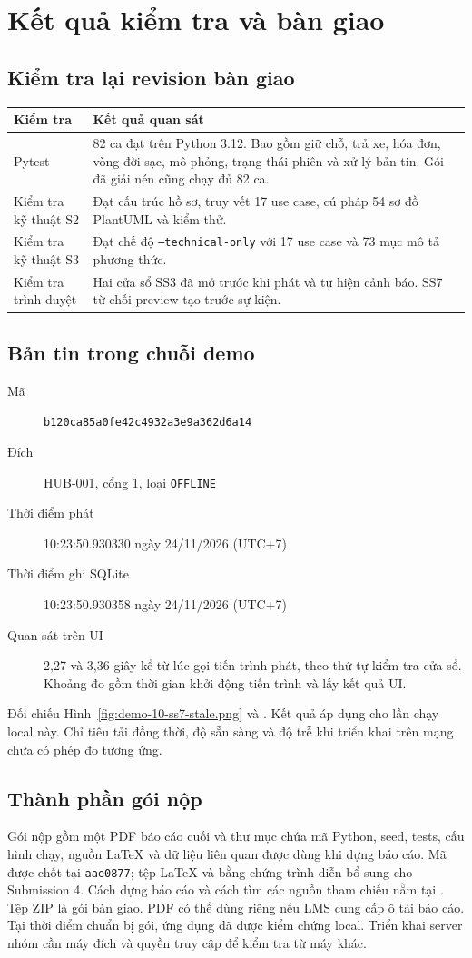 \chapter{Kết quả kiểm tra và bàn giao}
\section{Kiểm tra lại revision bàn giao}
\noindent\begin{tabularx}{\linewidth}{@{}p{.37\linewidth}X@{}}
\toprule
\textbf{Kiểm tra} & \textbf{Kết quả quan sát}\\
\midrule
Pytest & 82 ca đạt trên Python 3.12. Bao gồm giữ chỗ, trả xe, hóa đơn, vòng đời sạc,
mô phỏng, trạng thái phiên và xử lý bản tin. Gói đã giải nén cũng chạy đủ 82 ca.\\
Kiểm tra kỹ thuật S2 & Đạt cấu trúc hồ sơ, truy vết 17 use case, cú pháp 54 sơ đồ PlantUML và kiểm thử.\\
Kiểm tra kỹ thuật S3 & Đạt chế độ \texttt{--technical-only} với 17 use case và 73 mục mô tả phương thức.\\
Kiểm tra trình duyệt & Hai cửa sổ SS3 đã mở trước khi phát và tự hiện cảnh báo.
SS7 từ chối preview tạo trước sự kiện.\\
\bottomrule
\end{tabularx}

\section{Bản tin trong chuỗi demo}
\begin{description}
\item[Mã] \texttt{b120ca85a0fe42c4932a3e9a362d6a14}
\item[Đích] HUB-001, cổng 1, loại \texttt{OFFLINE}
\item[Thời điểm phát] 10:23:50.930330 ngày 24/11/2026 (UTC+7)
\item[Thời điểm ghi SQLite] 10:23:50.930358 ngày 24/11/2026 (UTC+7)
\item[Quan sát trên UI] 2,27 và 3,36 giây kể từ lúc gọi tiến trình phát, theo thứ tự
kiểm tra cửa sổ. Khoảng đo gồm thời gian khởi động tiến trình và lấy kết quả UI.
\end{description}
Đối chiếu Hình~\ref{fig:demo-10-ss7-stale.png} và
.
Kết quả áp dụng cho lần chạy local này. Chỉ tiêu tải đồng thời, độ sẵn sàng và
độ trễ khi triển khai trên mạng chưa có phép đo tương ứng.

\section{Thành phần gói nộp}
Gói nộp gồm một PDF báo cáo cuối và thư mục  chứa mã Python,
seed, tests, cấu hình chạy, nguồn LaTeX và dữ liệu liên quan được dùng khi dựng báo cáo.
Mã được chốt tại \texttt{aae0877}; tệp LaTeX và bằng chứng trình diễn bổ sung cho Submission 4.
Cách dựng báo cáo và cách tìm các nguồn tham chiếu nằm tại
.
Tệp ZIP là gói bàn giao. PDF có thể dùng riêng nếu LMS cung cấp ô tải báo cáo.
Tại thời điểm chuẩn bị gói, ứng dụng đã được kiểm chứng local. Triển khai server
nhóm cần máy đích và quyền truy cập để kiểm tra từ máy khác.

